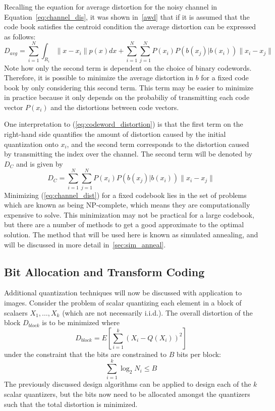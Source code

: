\documentclass[10pt]{article}
\begin{document}
Recalling the equation for average distortion for the noisy channel in Equation~\ref{eq:channel_dis}, it was shown in~\ref{awd} that  if it is assumed that the code book satisfies the centroid condition the average distortion can be expressed as follows:
\begin{equation}
\label{eq:codeword_distortion}
D_{avg}  = \sum_{i=1}^N \int_{R_i} \|x - x_i\|p(x)dx + \sum_{i=1}^N \sum_{j=1}^N P(x_i) P(b(x_j)|b(x_i)) \|x_i - x_j\|
\end{equation}
Note how only the second term is dependent on the choice of binary codewords. Therefore, it is possible to minimize the average distortion in $b$ for a fixed code book by only considering this second term. This term may be easier to minimize in practice because it only depends on the probabiliy of transmitting each code vector $P(x_i)$ and the distortions between code vectors.

One interpretation to (\ref{eq:codeword_distortion}) is that the first term on the right-hand side quantifies the amount of distortion caused by the initial quantization onto $x_i$, and the second term corresponds to the distortion caused by transmitting the index over the channel. The second term will be denoted by $D_C$ and is given by
\begin{equation}
  \label{eq:channel_dist}
D_C = \sum_{i=1}^N \sum_{j=1}^N P(x_i) P(b(x_j)|b(x_i)) \|x_i - x_j\|
\end{equation}
Minimizing (\ref{eq:channel_dist}) for a fixed codebook lies in the set of problems which are known as being NP-complete, which means they are computationally expensive to solve. This minimization may not be practical for a large codebook, but there are a number of methods to get a good approximate to the optimal solution. The method that will be used here is known as simulated annealing, and will be discussed in more detail in~\ref{sec:sim_anneal}.

\subsection{Bit Allocation and Transform Coding}
\label{sec:bit_alloc}
Additional quantization techniques will now be discussed with application to images. Consider the problem of scalar quantizing each element in a block of scalaers $X_1,\ldots,X_k$ (which are not necessarily i.i.d.). The overall distortion of the block $D_{block}$ is to be minimized where
\begin{equation}
D_{block} = E[\sum_{i=1}^k(X_i - Q(X_i))^2]
\end{equation}
under the constraint that the bits are constrained to $B$ bits per block:
\begin{equation}
\sum_{i=1}^k \log_2 N_i \le B
\end{equation}
The previously discussed design algorithms can be applied to design each of the $k$ scalar quantizers, but the bits now need to be allocated amongst the quantizers such that the total distortion is minimized.
\end{document}

